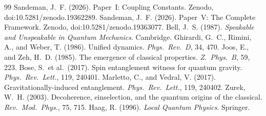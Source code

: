 \documentclass[12pt,a4paper]{article}
\begin{document}

\begin{thebibliography}{99}
 Sandeman, J.~F. (2026). Paper~I: Coupling Constants. Zenodo, doi:10.5281/zenodo.19362289.
 Sandeman, J.~F. (2026). Paper~V: The Complete Framework. Zenodo, doi:10.5281/zenodo.19363077.
 Bell, J.~S. (1987). \textit{Speakable and Unspeakable in Quantum Mechanics}. Cambridge.
 Ghirardi, G.~C., Rimini, A., and Weber, T. (1986). Unified dynamics. \textit{Phys.\ Rev.\ D}, 34, 470.
 Joos, E., and Zeh, H.~D. (1985). The emergence of classical properties. \textit{Z.\ Phys.\ B}, 59, 223.
 Bose, S.\ et al.\ (2017). Spin entanglement witness for quantum gravity. \textit{Phys.\ Rev.\ Lett.}, 119, 240401.
 Marletto, C., and Vedral, V. (2017). Gravitationally-induced entanglement. \textit{Phys.\ Rev.\ Lett.}, 119, 240402.
 Zurek, W.~H. (2003). Decoherence, einselection, and the quantum origins of the classical. \textit{Rev.\ Mod.\ Phys.}, 75, 715.
 Haag, R. (1996). \textit{Local Quantum Physics}. Springer.
\end{thebibliography}
\end{document}
